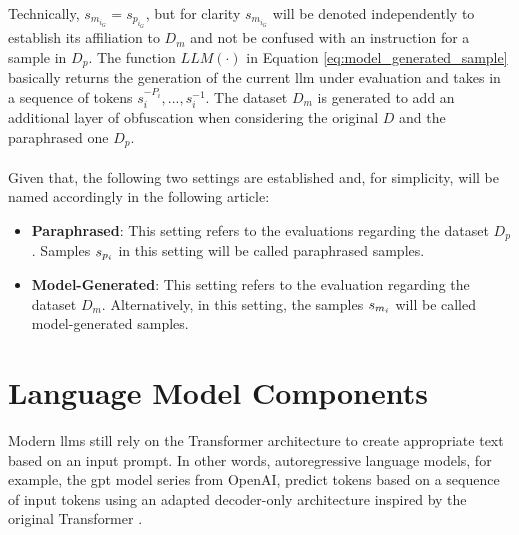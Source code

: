 Technically, $s_{m_{i_G}} = s_{p_{i_G}}$, but for clarity $s_{m_{i_G}}$ will be denoted independently to establish its affiliation to $D_m$ and not be confused with an instruction for a sample in $D_p$. The function $LLM(\cdot)$ in Equation \ref{eq:model_generated_sample} basically returns the generation of the current \acrshort{llm} under evaluation and takes in a sequence of tokens $s_i^{-P_i},...,s_i^{-1}$. The dataset $D_m$ is generated to add an additional layer of obfuscation when considering the original $D$ and the paraphrased one $D_p$.
\\\\
Given that, the following two settings are established and, for simplicity, will be named accordingly in the following article:
\begin{itemize}
    \item \textbf{Paraphrased}: This setting refers to the evaluations regarding the dataset $D_p$. Samples $s_{p_i}$ in this setting will be called paraphrased samples.
    \item \textbf{Model-Generated}: This setting refers to the evaluation regarding the dataset $D_m$. Alternatively, in this setting, the samples $s_{m_i}$ will be called model-generated samples.
\end{itemize}

\section{Language Model Components}
Modern \acrlong{llm}s still rely on the Transformer architecture to create appropriate text based on an input prompt. In other words, autoregressive language models, for example, the \acrfull{gpt} model series from OpenAI, predict tokens based on a sequence of input tokens using an adapted decoder-only architecture inspired by the original Transformer \cite{vaswani2023attentionneed}.

